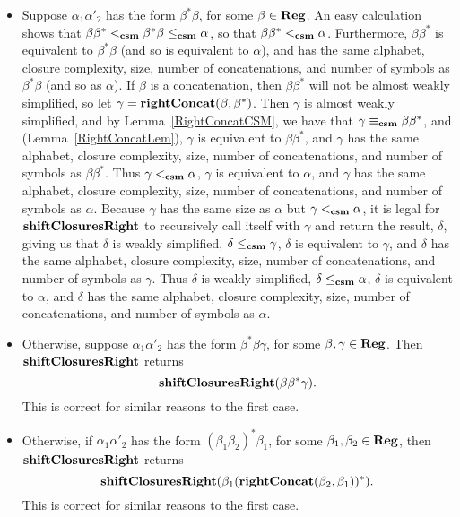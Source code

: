 \begin{itemize}
\item Suppose $\alpha_1\alpha'_2$ has the form $\beta^*\beta$, for
  some $\beta\in\mathbf{Reg}$.  An easy calculation shows that
  $\beta\beta^* \mathrel{<_{\mathbf{csm}}} \beta^*\beta\mathrel{\leq_{\mathbf{csm}}}\alpha$, so that
  $\beta\beta^* \mathrel{<_{\mathbf{csm}}} \alpha$.  Furthermore, $\beta\beta^*$ is
  equivalent to $\beta^*\beta$ (and so is equivalent to $\alpha$), and
  has the same alphabet, closure complexity, size, number of
  concatenations, and number of symbols as $\beta^*\beta$ (and so as
  $\alpha$). If $\beta$ is a concatenation, then $\beta\beta^*$ will
  not be almost weakly simplified, so let
  $\gamma = \mathbf{rightConcat}(\beta, \beta^*)$. Then $\gamma$ is almost
  weakly simplified, and by Lemma~\ref{RightConcatCSM}, we have that
  $\gamma\mathrel{\equiv_{\mathbf{csm}}}\beta\beta^*$, and (Lemma~\ref{RightConcatLem}),
  $\gamma$ is equivalent to $\beta\beta^*$, and $\gamma$ has the same
  alphabet, closure complexity, size, number of concatenations, and
  number of symbols as $\beta\beta^*$. Thus $\gamma\mathrel{<_{\mathbf{csm}}}\alpha$,
  $\gamma$ is equivalent to $\alpha$, and $\gamma$ has the same
  alphabet, closure complexity, size, number of concatenations, and
  number of symbols as $\alpha$.  Because $\gamma$ has the same size
  as $\alpha$ but $\gamma\mathrel{<_{\mathbf{csm}}}\alpha$, it is legal for
  $\mathbf{shiftClosuresRight}$ to recursively call itself with $\gamma$ and
  return the result, $\delta$, giving us that $\delta$ is weakly
  simplified, $\delta\mathrel{\leq_{\mathbf{csm}}}\gamma$, $\delta$ is equivalent to
  $\gamma$, and $\delta$ has the same alphabet, closure complexity,
  size, number of concatenations, and number of symbols as
  $\gamma$. Thus $\delta$ is weakly simplified, $\delta\mathrel{\leq_{\mathbf{csm}}}\alpha$,
  $\delta$ is equivalent to $\alpha$, and $\delta$ has the same
  alphabet, closure complexity, size, number of concatenations, and
  number of symbols as $\alpha$.

\item Otherwise, suppose $\alpha_1\alpha'_2$ has the form
  $\beta^*\beta\gamma$, for some $\beta,\gamma\in\mathbf{Reg}$. Then
  $\mathbf{shiftClosuresRight}$ returns
  \begin{displaymath}
   \mathbf{shiftClosuresRight}(\beta\beta^*\gamma) . 
  \end{displaymath}
  This is correct for similar reasons to the first case.

\item Otherwise, if $\alpha_1\alpha'_2$ has the form
  $(\beta_1\beta_2)^*\beta_1$, for some
  $\beta_1,\beta_2\in\mathbf{Reg}$, then $\mathbf{shiftClosuresRight}$ returns
  \begin{displaymath}
   \mathbf{shiftClosuresRight}(\beta_1(\mathbf{rightConcat}(\beta_2,\beta_1))^*) . 
  \end{displaymath}
  This is correct for similar reasons to the first case.


\end{itemize}
